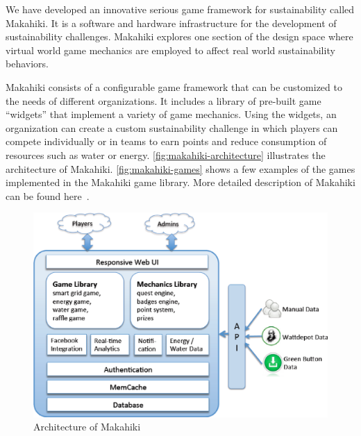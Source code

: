 \documentclass{sigchi}
\begin{document}
We have developed an innovative serious game framework for sustainability
called Makahiki. It is a software and hardware infrastructure for the development of
sustainability challenges. Makahiki explores one section of the design
space where virtual world game mechanics are employed to affect real
world sustainability behaviors.

Makahiki consists of a configurable game framework that can be customized
to the needs of different organizations. It includes a library of
pre-built game ``widgets'' that implement a variety of game mechanics.
Using the widgets, an organization can create a custom sustainability
challenge in which players can compete individually or in teams to
earn points and reduce consumption of resources such as water or energy.
\autoref{fig:makahiki-architecture} illustrates the architecture of
Makahiki. \autoref{fig:makahiki-games} shows a few examples of the
games implemented in the Makahiki game library. More detailed
description of Makahiki can be found here~\cite{csdl2-12-06}.

\begin{figure}
  \center
  \includegraphics[width=\columnwidth]{makahiki-system-architecture}
  \caption{Architecture of Makahiki}
  \label{fig:makahiki-architecture}
\end{figure}
\end{document}
